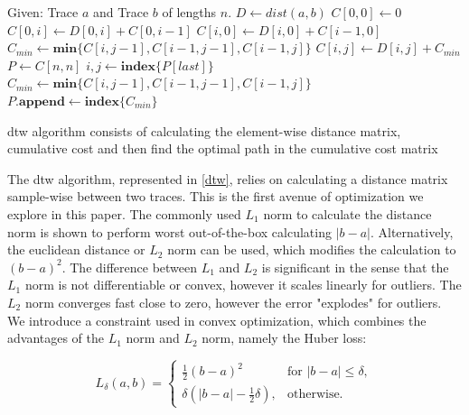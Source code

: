 \begin{algorithm}
\begin{algorithmic}
\State Given: Trace $a$ and Trace $b$ of lengths $n$.
    \State $D \gets dist(a,b)$
\EndFunction
{}
\State $C[0,0] \gets 0$
 
    \State $C[0,i] \gets D[0,i] + C[0,i-1]$
    \State $C[i,0] \gets D[i,0] + C[i-1,0]$
\EndFor
{} 
        \State $C_{min} \gets \textbf{min} \{C[i,j-1], C[i-1,j-1], C[i-1,j]\}$
        \State $C[i,j] \gets D[i,j] + C_{min}$
    \EndFor
\EndFor
\EndFunction
{}
\State $P \gets C[n,n]$
    \State $i, j \gets \textbf{index} \{ P[last] \}$
    \State $C_{min} \gets \textbf{min} \{C[i,j-1], C[i-1,j-1], C[i-1,j]\}$
    \State $P.\textbf{append} \gets \textbf{index} \{ C_{min} \}$
\EndWhile
\EndFunction
\State {}
\EndProcedure
\end{algorithmic}
\caption{\acl{dtw} algorithm consists of calculating the element-wise distance matrix, cumulative cost and then find the optimal path in the cumulative cost matrix} \label{dtw}
\end{algorithm}

The \ac{dtw} algorithm, represented in \cref{dtw}, relies on calculating a distance matrix sample-wise between two traces. This is the first avenue of optimization we explore in this paper. The commonly used $L_1$ norm to calculate the distance norm is shown to perform worst out-of-the-box calculating $|b-a|$. Alternatively, the euclidean distance or $L_2$ norm can be used, which modifies the calculation to $(b-a)^2$. The difference between $L_1$ and $L_2$ is significant in the sense that the $L_1$ norm is not differentiable or convex, however it scales linearly for outliers. The $L_2$ norm converges fast close to zero, however the error "explodes" for outliers. We introduce a constraint used in convex optimization, which combines the advantages of the $L_1$ norm and $L_2$ norm, namely the Huber loss:

\begin{equation}
L_\delta (a, b) = 
\begin{cases}
 \frac{1}{2} (b-a)^2 & \text{for } |b-a| \le \delta, \\
 \delta (|b-a| - \frac{1}{2} \delta), & \text{otherwise.}
\end{cases}
\label{eq:huber}
\end{equation}

